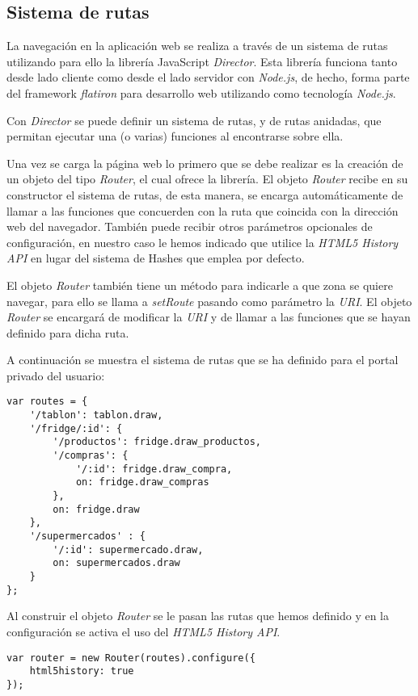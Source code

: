 \subsection{Sistema de rutas}

La navegación en la aplicación web se realiza a través de un sistema de rutas utilizando para ello la librería JavaScript \emph{Director}. Esta librería funciona tanto desde lado cliente como desde el lado servidor con \emph{Node.js}, de hecho, forma parte del framework \emph{flatiron} para desarrollo web utilizando como tecnología \emph{Node.js}.

Con \emph{Director} se puede definir un sistema de rutas, y de rutas anidadas, que permitan ejecutar una (o varias) funciones al encontrarse sobre ella.

Una vez se carga la página web lo primero que se debe realizar es la creación de un objeto del tipo \emph{Router}, el cual ofrece la librería. El objeto \emph{Router} recibe en su constructor el sistema de rutas, de esta manera, se encarga automáticamente de llamar a las funciones que concuerden con la ruta que coincida con la dirección web del navegador. También puede recibir otros parámetros opcionales de configuración, en nuestro caso le hemos indicado que utilice la \emph{HTML5 History API} en lugar del sistema de Hashes que emplea por defecto.

El objeto \emph{Router} también tiene un método para indicarle a que zona se quiere navegar, para ello se llama a \emph{setRoute} pasando como parámetro la \emph{URI}. El objeto \emph{Router} se encargará de modificar la \emph{URI} y de llamar a las funciones que se hayan definido para dicha ruta.

A continuación se muestra el sistema de rutas que se ha definido para el portal privado del usuario:

    \begin{lstlisting}
var routes = {
    '/tablon': tablon.draw,
    '/fridge/:id': {
        '/productos': fridge.draw_productos,
        '/compras': {
            '/:id': fridge.draw_compra,
            on: fridge.draw_compras
        },
        on: fridge.draw
    },
    '/supermercados' : {
        '/:id': supermercado.draw,
        on: supermercados.draw
    }
};
    \end{lstlisting}

Al construir el objeto \emph{Router} se le pasan las rutas que hemos definido y en la configuración se activa el uso del \emph{HTML5 History API}.

    \begin{lstlisting}
var router = new Router(routes).configure({
    html5history: true
});
    \end{lstlisting}


